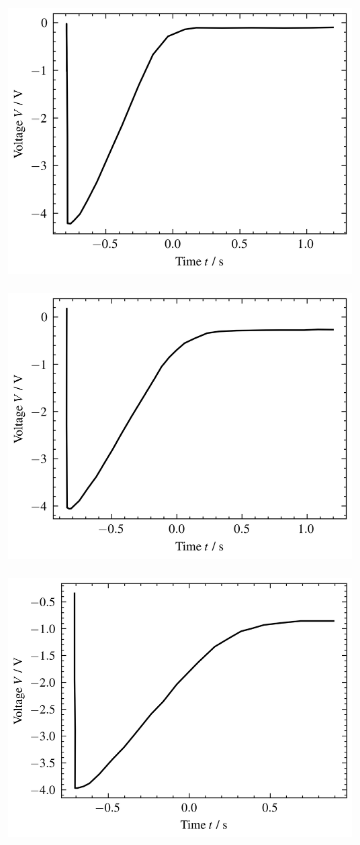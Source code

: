 \begin{figure}
	\centering
	\begin{subfigure}{0.48\columnwidth}
		\centering
		\includegraphics[width=0.8\linewidth]{src/figures/oscilloscope-each/p60-d0-oscilloscope.csv.png}
		\label{fig:oscilloscope-each-p60-d0}
	\end{subfigure}
	\begin{subfigure}{0.48\columnwidth}
		\centering
		\includegraphics[width=0.8\linewidth]{src/figures/oscilloscope-each/p60-d60-oscilloscope.csv.png}
		\label{fig:oscilloscope-each-p60-d60}
	\end{subfigure}
	\begin{subfigure}{0.48\columnwidth}
		\centering
		\includegraphics[width=0.8\linewidth]{src/figures/oscilloscope-each/p60-d80-oscilloscope.csv.png}

\end{subfigure}
\end{figure}
